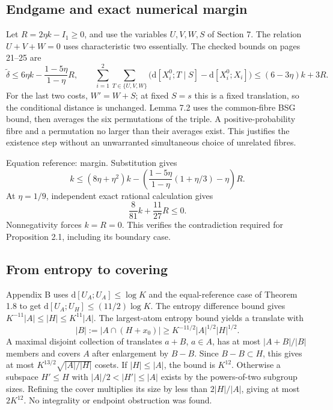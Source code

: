 \documentclass[10pt]{article}
\begin{document}
\subsection*{Endgame and exact numerical margin}
Let \(R=2\eta k-I_1\ge0\), and use the variables \(U,V,W,S\) of Section 7. The relation \(U+V+W=0\) uses characteristic two essentially. The checked bounds on pages 21–25 are \[\widetilde\delta\le6\eta k-\frac{1-5\eta}{1-\eta}R,\qquad
 \sum_{i=1}^2\sum_{T\in\{U,V,W\}}
  \bigl(\mathrm d[X_i^0;T\mid S]-\mathrm d[X_i^0;X_i]\bigr)
 \le(6-3\eta)k+3R.\] For the last two costs, \(W'=W+S\); at fixed \(S=s\) this is a fixed translation, so the conditional distance is unchanged. Lemma 7.2 uses the common-fibre BSG bound, then averages the six permutations of the triple. A positive-probability fibre and a permutation no larger than their averages exist. This justifies the existence step without an unwarranted simultaneous choice of unrelated fibres.\par
Equation reference: margin. Substitution gives \[k\le(8\eta+\eta^2)k-
 \left(\frac{1-5\eta}{1-\eta}(1+\eta/3)-\eta\right)R.\] At \(\eta=1/9\), independent exact rational calculation gives \[
 \frac8{81}k+\frac{11}{27}R\le0.\] Nonnegativity forces \(k=R=0\). This verifies the contradiction required for Proposition 2.1, including its boundary case.\par
\subsection*{From entropy to covering}
Appendix B uses \(\mathrm d[U_A;U_A]\le\log K\) and the equal-reference case of Theorem 1.8 to get \(\mathrm d[U_A;U_H]\le(11/2)\log K\). The entropy difference bound gives \(K^{-11}|A|\le|H|\le K^{11}|A|\). The largest-atom entropy bound yields a translate with \[|B|:=|A\cap(H+x_0)|\ge K^{-11/2}|A|^{1/2}|H|^{1/2}.\] A maximal disjoint collection of translates \(a+B\), \(a\in A\), has at most \(|A+B|/|B|\) members and covers \(A\) after enlargement by \(B-B\). Since \(B-B\subset H\), this gives at most \(K^{13/2}\sqrt{|A|/|H|}\) cosets. If \(|H|\le|A|\), the bound is \(K^{12}\). Otherwise a subspace \(H'\le H\) with \(|A|/2<|H'|\le|A|\) exists by the powers-of-two subgroup sizes. Refining the cover multiplies its size by less than \(2|H|/|A|\), giving at most \(2K^{12}\). No integrality or endpoint obstruction was found.\par
\end{document}

